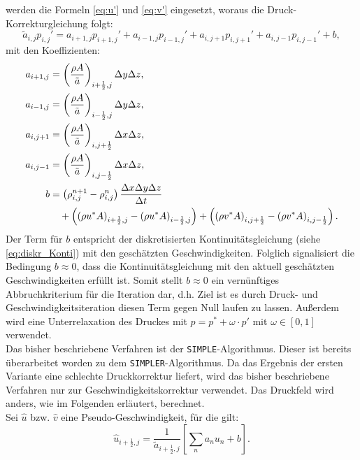 werden die Formeln \eqref{eq:u'} und \eqref{eq:v'} eingesetzt, woraus die Druck-Korrekturgleichung folgt:
\begin{equation} \label{eq:druckkorrekturglg}
\tilde{a}_{i,j} p_{i,j}' = a_{i+1,j} p_{i+1,j}'+a_{i-1,j} p_{i-1,j}'+a_{i,j+1} p_{i,j+1}'+a_{i,j-1} p_{i,j-1}'+b,
\end{equation}
mit den Koeffizienten:
\begin{align}
a_{i+1,j}&=\left(\dfrac{\rho A}{\tilde{a}}\right)_{i+\frac{1}{2},j}\Delta y\Delta z, \\
a_{i-1,j}&=\left(\dfrac{\rho A}{\tilde{a}}\right)_{i-\frac{1}{2},j}\Delta y\Delta z, \\
a_{i,j+1}&=\left(\dfrac{\rho A}{\tilde{a}}\right)_{i,j+\frac{1}{2}}\Delta x\Delta z, \\
a_{i,j-1}&=\left(\dfrac{\rho A}{\tilde{a}}\right)_{i,j-\frac{1}{2}}\Delta x\Delta z, \\
b &= \left(\rho_{i,j}^{n+1}-\rho_{i,j}^{n}\right)\dfrac{\Delta x\Delta y\Delta z}{\Delta t} \notag \\
& \quad +  \left(\left(\rho u^{*} A\right)_{i+\frac{1}{2},j}-\left(\rho u^{*} A\right)_{i-\frac{1}{2},j}\right) + \left(\left(\rho v^{*} A\right)_{i,j+\frac{1}{2}}-\left(\rho v^{*} A\right)_{i,j-\frac{1}{2}}\right). \label{eq:b}
\end{align}
Der Term f\"ur $b$ entspricht der diskretisierten Kontinuit\"atsgleichung (siehe \eqref{eq:diskr_Konti}) mit den gesch\"atzten Geschwindigkeiten. Folglich signalisiert die Bedingung $b\approx0$, dass die Kontinuit\"atsgleichung mit den aktuell gesch\"atzten Geschwindigkeiten erf\"ullt ist. Somit stellt $b\approx0$ ein vern\"unftiges Abbruchkriterium f\"ur die Iteration dar, d.h. Ziel ist es durch Druck- und Geschwindigkeitsiteration diesen Term gegen Null laufen zu lassen. Au\ss{}erdem wird eine Unterrelaxation des Druckes mit $p=p^{*}+\omega\cdot p'$ mit $\omega\in[0,1]$ verwendet. \\
Das bisher beschriebene Verfahren ist der \texttt{SIMPLE}-Algorithmus. Dieser ist bereits \"uberarbeitet worden zu dem \texttt{SIMPLER}-Algorithmus. Da das Ergebnis der ersten Variante eine schlechte Druckkorrektur liefert, wird das bisher beschriebene Verfahren nur zur Geschwindigkeitskorrektur verwendet. Das Druckfeld wird anders, wie im Folgenden erl\"autert, berechnet. \\
Sei $\hat{u}$ bzw. $\hat{v}$ eine Pseudo-Geschwindigkeit, f\"ur die gilt:
\begin{equation} \label{eq:pseudo_geschw}
\hat{u}_{i+\frac{1}{2},j}=\dfrac{1}{\tilde{a}_{i+\frac{1}{2},j}}\left[\sum\limits_{n}a_{n}u_{n}+b\right].
\end{equation}
